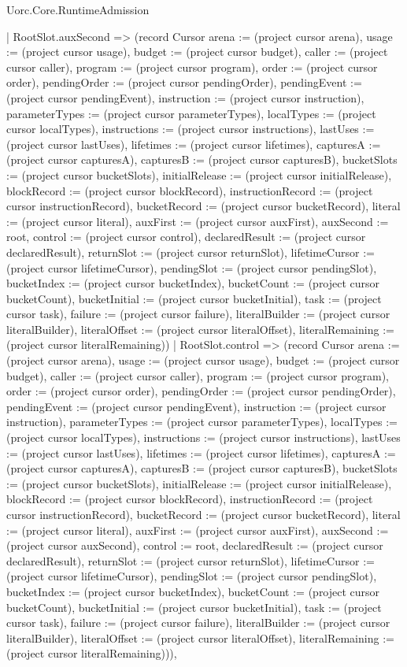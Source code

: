\begin{lexlean}{Uorc.Core.RuntimeAdmission}
\begin{semanticmodule}
{    | RootSlot.auxSecond => (record Cursor {arena := (project cursor arena), usage := (project cursor usage), budget := (project cursor budget), caller := (project cursor caller), program := (project cursor program), order := (project cursor order), pendingOrder := (project cursor pendingOrder), pendingEvent := (project cursor pendingEvent), instruction := (project cursor instruction), parameterTypes := (project cursor parameterTypes), localTypes := (project cursor localTypes), instructions := (project cursor instructions), lastUses := (project cursor lastUses), lifetimes := (project cursor lifetimes), capturesA := (project cursor capturesA), capturesB := (project cursor capturesB), bucketSlots := (project cursor bucketSlots), initialRelease := (project cursor initialRelease), blockRecord := (project cursor blockRecord), instructionRecord := (project cursor instructionRecord), bucketRecord := (project cursor bucketRecord), literal := (project cursor literal), auxFirst := (project cursor auxFirst), auxSecond := root, control := (project cursor control), declaredResult := (project cursor declaredResult), returnSlot := (project cursor returnSlot), lifetimeCursor := (project cursor lifetimeCursor), pendingSlot := (project cursor pendingSlot), bucketIndex := (project cursor bucketIndex), bucketCount := (project cursor bucketCount), bucketInitial := (project cursor bucketInitial), task := (project cursor task), failure := (project cursor failure), literalBuilder := (project cursor literalBuilder), literalOffset := (project cursor literalOffset), literalRemaining := (project cursor literalRemaining)})
    | RootSlot.control => (record Cursor {arena := (project cursor arena), usage := (project cursor usage), budget := (project cursor budget), caller := (project cursor caller), program := (project cursor program), order := (project cursor order), pendingOrder := (project cursor pendingOrder), pendingEvent := (project cursor pendingEvent), instruction := (project cursor instruction), parameterTypes := (project cursor parameterTypes), localTypes := (project cursor localTypes), instructions := (project cursor instructions), lastUses := (project cursor lastUses), lifetimes := (project cursor lifetimes), capturesA := (project cursor capturesA), capturesB := (project cursor capturesB), bucketSlots := (project cursor bucketSlots), initialRelease := (project cursor initialRelease), blockRecord := (project cursor blockRecord), instructionRecord := (project cursor instructionRecord), bucketRecord := (project cursor bucketRecord), literal := (project cursor literal), auxFirst := (project cursor auxFirst), auxSecond := (project cursor auxSecond), control := root, declaredResult := (project cursor declaredResult), returnSlot := (project cursor returnSlot), lifetimeCursor := (project cursor lifetimeCursor), pendingSlot := (project cursor pendingSlot), bucketIndex := (project cursor bucketIndex), bucketCount := (project cursor bucketCount), bucketInitial := (project cursor bucketInitial), task := (project cursor task), failure := (project cursor failure), literalBuilder := (project cursor literalBuilder), literalOffset := (project cursor literalOffset), literalRemaining := (project cursor literalRemaining)})),
}
\end{semanticmodule}
\end{lexlean}
